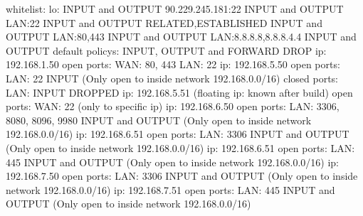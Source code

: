 \markdownRendererInterblockSeparator
{}\markdownRendererInterblockSeparator
{}whitelist:\markdownRendererLineBreak
{}lo: INPUT and OUTPUT\markdownRendererLineBreak
{}90.229.245.181:22 INPUT and OUTPUT\markdownRendererLineBreak
{}LAN:22 INPUT and OUTPUT\markdownRendererLineBreak
{}RELATED,ESTABLISHED INPUT and OUTPUT\markdownRendererLineBreak
{}LAN:80,443 INPUT and OUTPUT\markdownRendererLineBreak
{}LAN:8.8.8.8,8.8.8.4.4 INPUT and OUTPUT \markdownRendererInterblockSeparator
{}default policys:\markdownRendererLineBreak
{}INPUT, OUTPUT and FORWARD DROP\markdownRendererInterblockSeparator
{}\markdownRendererInterblockSeparator
{}ip: 192.168.1.50\markdownRendererLineBreak
{}open ports:\markdownRendererLineBreak
{}WAN: 80, 443\markdownRendererLineBreak
{}LAN: 22\markdownRendererInterblockSeparator
{}\markdownRendererInterblockSeparator
{}ip: 192.168.5.50\markdownRendererLineBreak
{}open ports:\markdownRendererLineBreak
{}LAN: 22 INPUT\markdownRendererLineBreak
{}(Only open to inside network 192.168.0.0/16)\markdownRendererLineBreak
{}closed ports:\markdownRendererLineBreak
{}LAN: INPUT DROPPED\markdownRendererInterblockSeparator
{}\markdownRendererInterblockSeparator
{}ip: 192.168.5.51 (floating ip: known after build)\markdownRendererLineBreak
{}open ports:\markdownRendererLineBreak
{}WAN: 22\markdownRendererLineBreak
{}(only to specific ip)\markdownRendererInterblockSeparator
{}\markdownRendererInterblockSeparator
{}ip: 192.168.6.50\markdownRendererLineBreak
{}open ports:\markdownRendererLineBreak
{}LAN: 3306, 8080, 8096, 9980 INPUT and OUTPUT\markdownRendererLineBreak
{}(Only open to inside network 192.168.0.0/16)\markdownRendererInterblockSeparator
{}\markdownRendererInterblockSeparator
{}ip: 192.168.6.51\markdownRendererLineBreak
{}open ports:\markdownRendererLineBreak
{}LAN: 3306 INPUT and OUTPUT\markdownRendererLineBreak
{}(Only open to inside network 192.168.0.0/16)\markdownRendererInterblockSeparator
{}\markdownRendererInterblockSeparator
{}ip: 192.168.6.51\markdownRendererLineBreak
{}open ports:\markdownRendererLineBreak
{}LAN: 445 INPUT and OUTPUT\markdownRendererLineBreak
{}(Only open to inside network 192.168.0.0/16)\markdownRendererInterblockSeparator
{}\markdownRendererInterblockSeparator
{}ip: 192.168.7.50\markdownRendererLineBreak
{}open ports:\markdownRendererLineBreak
{}LAN: 3306 INPUT and OUTPUT\markdownRendererLineBreak
{}(Only open to inside network 192.168.0.0/16)\markdownRendererInterblockSeparator
{}\markdownRendererInterblockSeparator
{}ip: 192.168.7.51\markdownRendererLineBreak
{}open ports:\markdownRendererLineBreak
{}LAN: 445 INPUT and OUTPUT\markdownRendererLineBreak
{}(Only open to inside network 192.168.0.0/16)\relax